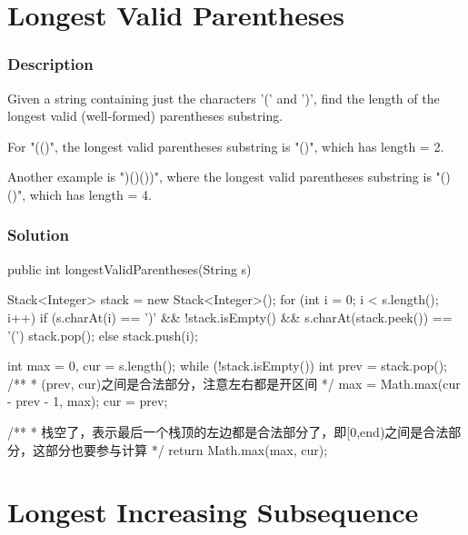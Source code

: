 \begin{Code}

\end{Code}

\newpage

\section{Longest Valid Parentheses} %

\subsubsection{Description}
Given a string containing just the characters '(' and ')', find the length of the longest valid (well-formed) parentheses substring.

For "(()", the longest valid parentheses substring is "()", which has length = 2.

Another example is ")()())", where the longest valid parentheses substring is "()()", which has length = 4.

\subsubsection{Solution}

\begin{Code}
public int longestValidParentheses(String s) {
    Stack<Integer> stack = new Stack<Integer>();
    for (int i = 0; i < s.length(); i++) {
        if (s.charAt(i) == ')' && !stack.isEmpty() && s.charAt(stack.peek()) == '(') {
            stack.pop();
        } else {
            stack.push(i);
        }
    }

    int max = 0, cur = s.length();
    while (!stack.isEmpty()) {
        int prev = stack.pop();
        /**
         * (prev, cur)之间是合法部分，注意左右都是开区间
         */
        max = Math.max(cur - prev - 1, max);
        cur = prev;
    }

    /**
     * 栈空了，表示最后一个栈顶的左边都是合法部分了，即[0,end)之间是合法部分，这部分也要参与计算
     */
    return Math.max(max, cur);
}
\end{Code}

\newpage

\section{Longest Increasing Subsequence} %

